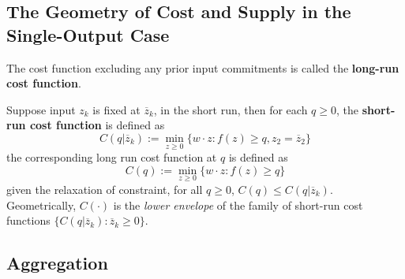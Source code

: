 \documentclass{article}
\begin{document}
	 	\subsection{The Geometry of Cost and Supply in the Single-Output Case}
	 		\begin{definition}
	 			The cost function excluding any prior input commitments is called the \textbf{long-run cost function}.
	 		\end{definition}
	 		
	 		\begin{remark}
	 			Suppose input $z_k$ is fixed at $\overline{z}_k$, in the short run, then for each $q \geq 0$, the \textbf{short-run cost function} is defined as
	 			\begin{equation}
	 				C(q|\overline{z}_k) := \min_{z \geq 0}\{w\cdot z: f(z) \geq q, z_2=\overline{z}_2\}
	 			\end{equation}
	 			the corresponding long run cost function at $q$ is defined as 
	 			\begin{equation}
	 				C(q) := \min_{z \geq 0}\{w\cdot z: f(z) \geq q\}
	 			\end{equation}
	 			given the relaxation of constraint, for all $q \geq 0$, $C(q) \leq C(q|\overline{z}_k)$. Geometrically, $C(\cdot)$ is the \emph{lower envelope} of the family of short-run cost functions $\{C(q|\overline{z}_k): \overline{z}_k \geq 0\}$.
	 		\end{remark}
	 		
	 	\subsection{Aggregation}
\end{document}
